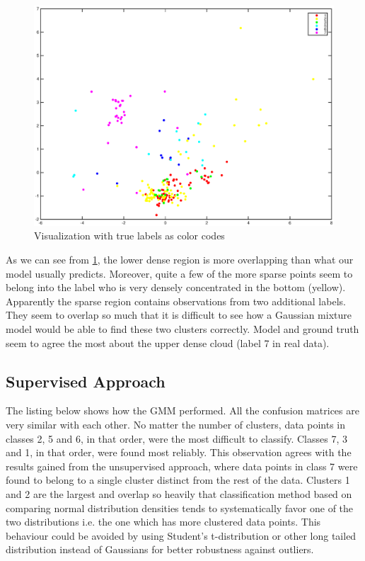 \documentclass[a4paper]{article}
\begin{document}
\begin{figure}[H]
	\includegraphics[trim={3.5cm 1.5cm 3cm 1.3cm},clip,scale=0.45]{MDS_true_labels.eps}
	\caption{Visualization with true labels as color codes}
	\label{true_labels}
\end{figure}

As we can see from \ref{true_labels}, the lower dense region is more overlapping than what our model usually predicts. Moreover,  quite a few of the more sparse points seem to belong into the label who is very densely concentrated in the bottom (yellow). Apparently the sparse region contains observations from two additional labels. They seem to overlap so much that it is difficult to see how a Gaussian mixture model would be able to find these two clusters correctly. Model and ground truth seem to agree the most about the upper dense cloud (label 7 in real data). 

\subsection{Supervised Approach}

The listing below shows how the GMM performed.
All the confusion matrices are very similar with each other. No matter the
number of clusters, data points in classes 2, 5 and 6, in that order, were the
most difficult to classify. Classes 7, 3 and 1, in that order, were found most
reliably. This observation agrees with the results gained from the unsupervised
approach, where data points in class 7 were found to belong to a single cluster
distinct from the rest of the data. Clusters 1 and 2 are the largest and
overlap so heavily that classification method based on comparing normal
distribution densities tends to systematically favor one of the two
distributions i.e. the one which has more clustered data points. This behaviour
could be avoided by using Student's t-distribution or other long tailed
distribution instead of Gaussians for better robustness against outliers.
\end{document}

